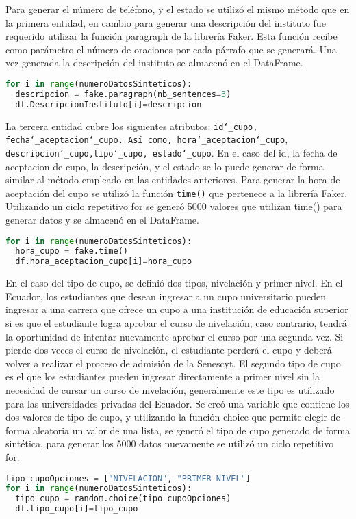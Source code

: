 \documentclass[10pt, oneside,spanish]{article}   	%
\begin{document}
 Para generar el número de teléfono, y el estado se utilizó el mismo método que en la primera entidad, en cambio para generar una descripción del instituto fue requerido utilizar la función paragraph de la librería Faker. Esta función recibe como parámetro el número de oraciones por cada párrafo que se generará. Una vez generada la descripción del instituto se almacenó en el DataFrame. 
 
   \begin{lstlisting}[language=Python, caption=Python example,numbers=none,xleftmargin=.15in,xrightmargin=.15in]  
for i in range(numeroDatosSinteticos):
  descripcion = fake.paragraph(nb_sentences=3)
  df.DescripcionInstituto[i]=descripcion
  \end{lstlisting}
 La tercera entidad cubre los siguientes atributos: \texttt{id\texttt{\char`_}cupo, fecha\texttt{\char`_}aceptacion\texttt{\char`_}cupo.
  Así como, hora\texttt{\char`_}aceptacion\texttt{\char`_}cupo}, 
 \texttt{descripcion\texttt{\char`_}cupo,tipo\texttt{\char`_}cupo, estado\texttt{\char`_}cupo}. En el caso del id, la fecha de aceptacion de cupo, la descripción, y el estado se lo puede generar de forma similar al método empleado en las entidades anteriores. Para generar la hora de aceptación del cupo se utilizó la función \texttt{time()} que pertenece a la librería Faker. Utilizando un ciclo repetitivo for se generó 5000 valores que utilizan time() para generar datos y se almacenó en el DataFrame.
    \begin{lstlisting}[language=Python, caption=Python example,numbers=none,xleftmargin=.15in,xrightmargin=.15in]  
for i in range(numeroDatosSinteticos):
  hora_cupo = fake.time()
  df.hora_aceptacion_cupo[i]=hora_cupo
  \end{lstlisting}
 
 En el caso del tipo de cupo, se definió dos tipos, nivelación y primer nivel. En el Ecuador, los estudiantes que desean ingresar a un cupo universitario pueden ingresar a una carrera que ofrece un cupo a una institución de educación superior si es que el estudiante logra aprobar el curso de nivelación, caso contrario, tendrá la oportunidad de intentar nuevamente aprobar el curso por una segunda vez. Si pierde dos veces el curso de nivelación, el estudiante perderá el cupo y deberá volver a realizar el proceso de admisión de la Senescyt. El segundo tipo de cupo es el que los estudiantes pueden ingresar directamente a primer nivel sin la necesidad de cursar un curso de nivelación, generalmente este tipo es utilizado para las universidades privadas del Ecuador. Se creó una variable que contiene los dos valores de tipo de cupo, y utilizando la función choice que permite elegir de forma aleatoria un valor de una lista, se generó el tipo de cupo generado de forma sintética, para generar los 5000 datos nuevamente se utilizó un ciclo repetitivo for.
     \begin{lstlisting}[language=Python, caption=Python example,numbers=none,xleftmargin=.15in,xrightmargin=.15in]  
tipo_cupoOpciones = ["NIVELACION", "PRIMER NIVEL"]
for i in range(numeroDatosSinteticos):
  tipo_cupo = random.choice(tipo_cupoOpciones)
  df.tipo_cupo[i]=tipo_cupo
  \end{lstlisting}
  
\end{document}
